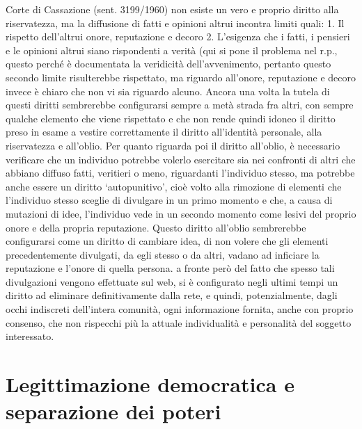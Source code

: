 Corte di Cassazione (sent. 3199/1960) non esiste un vero e proprio diritto alla riservatezza, ma la diffusione di fatti e opinioni altrui incontra limiti quali:
1.	Il rispetto dell’altrui onore, reputazione e decoro
2.	L’esigenza che i fatti, i pensieri e le opinioni altrui siano rispondenti a verità (qui si pone il problema nel r.p., questo perché è documentata la veridicità dell’avvenimento, pertanto questo secondo limite risulterebbe rispettato, ma riguardo all’onore, reputazione e decoro invece è chiaro che non vi sia riguardo alcuno. Ancora una volta la tutela di questi diritti sembrerebbe configurarsi sempre a metà strada fra altri, con sempre qualche elemento che viene rispettato e che non rende quindi idoneo il diritto preso in esame a vestire correttamente il diritto all’identità personale, alla riservatezza e all’oblio.
Per quanto riguarda poi il diritto all’oblio, è necessario verificare che un individuo potrebbe volerlo esercitare sia nei confronti di altri che abbiano diffuso fatti, veritieri o meno, riguardanti l’individuo stesso, ma potrebbe anche essere un diritto ‘autopunitivo’, cioè volto alla rimozione di elementi che l’individuo stesso sceglie di divulgare in un primo momento e che, a causa di mutazioni di idee, l’individuo vede in un secondo momento come lesivi del proprio onore e della propria reputazione.
Questo diritto all’oblio sembrerebbe configurarsi come un diritto di cambiare idea, di non volere che  gli elementi precedentemente divulgati, da egli stesso o da altri, vadano ad inficiare la reputazione e l’onore di quella persona. a fronte però del fatto che spesso tali divulgazioni vengono effettuate sul web, si è configurato negli ultimi tempi un diritto ad eliminare definitivamente dalla rete, e quindi, potenzialmente, dagli occhi indiscreti dell’intera comunità, ogni informazione fornita, anche con proprio consenso, che non rispecchi più la attuale individualità e personalità del soggetto interessato. 


\section{Legittimazione democratica e separazione dei poteri}
